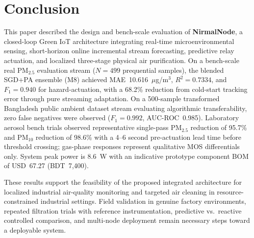 \documentclass[12pt,a4paper]{article}
\newcommand{\ugsm}{$\mu$g/m$^3$}
\begin{document}
\section{Conclusion}
\label{sec:conclusion}

This paper described the design and bench-scale evaluation of \textbf{NirmalNode}, a
closed-loop Green IoT architecture integrating real-time microenvironmental sensing,
short-horizon online incremental stream forecasting, predictive relay actuation, and localized
three-stage physical air purification. On a bench-scale real PM$_{2.5}$ evaluation stream ($N=499$
prequential samples), the blended SGD+PA ensemble (M8) achieved MAE~10.616~\ugsm,
$R^2=0.7334$, and $F_1=0.940$ for hazard-actuation, with a 68.2\% reduction from
cold-start tracking error through pure streaming adaptation. On a 500-sample transformed Bangladesh
public ambient dataset stream evaluating algorithmic transferability, zero false negatives were observed
($F_1=0.992$, AUC-ROC~0.985). Laboratory aerosol bench trials observed representative single-pass PM$_{2.5}$
reduction of 95.7\% and PM$_{10}$ reduction of 98.6\% with a 4--6 second pre-actuation lead time before
threshold crossing; gas-phase responses represent qualitative MOS differentials only.
System peak power is 8.6~W with an indicative prototype component BOM of
USD~67.27 (BDT~7,400).

These results support the feasibility of the proposed integrated architecture for
localized industrial air-quality monitoring and targeted air cleaning in
resource-constrained industrial settings. Field validation in genuine factory
environments, repeated filtration trials with reference instrumentation, predictive
vs.\ reactive controlled comparison, and multi-node deployment remain necessary
steps toward a deployable system.




\end{document}
